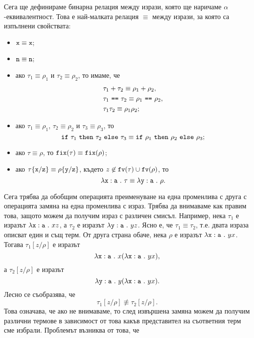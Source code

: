 Сега ще дефинираме бинарна релация между изрази, която ще наричаме $\alpha$-еквивалентност.
Това е най-малката релация $\equiv$ между изрази, за която са изпълнени свойствата:
\begin{itemize}
\item
  $\texttt{x} \equiv \texttt{x}$;
\item
  $\texttt{n} \equiv \texttt{n}$;
\item
  ако $\tau_1 \equiv \rho_1$ и $\tau_2 \equiv \rho_2$, то имаме, че
  \begin{align*}
    & \tau_1 + \tau_2 \equiv \rho_1 + \rho_2,\\
    & \tau_1\ \texttt{==}\ \tau_2 \equiv \rho_1\ \texttt{==}\ \rho_2,\\
    & \tau_1 \tau_2 \equiv \rho_1 \rho_2;
  \end{align*}
\item
  ако $\tau_1 \equiv \rho_1$, $\tau_2 \equiv \rho_2$ и $\tau_3 \equiv \rho_3$, то
  \[\texttt{if}\ \tau_1\ \texttt{then}\ \tau_2\ \texttt{else}\ \tau_3 \equiv \texttt{if}\ \rho_1\ \texttt{then}\ \rho_2\ \texttt{else}\ \rho_3;\]
\item
  ако $\tau \equiv \rho$, то $\texttt{fix}(\tau) \equiv \texttt{fix}(\rho)$;
\item
  ако $\tau\{\texttt{x}/\texttt{z}\} \equiv \rho\{\texttt{y}/\texttt{z}\}$, където $z \not\in \texttt{fv}(\tau) \cup \texttt{fv}(\rho)$, то
  \[\lambda\texttt{x}:\texttt{a}\ .\ {\tau} \equiv \lambda\texttt{y}:\texttt{a}\ .\ {\rho}.\]
\end{itemize}

Сега трябва да обобщим операцията преименуване на една променлива с друга с
операцията замяна на една променлива с израз.
Трябва да внимаваме как правим това, защото можем да получим
израз с различен смисъл. Например, нека $\tau_1$ е изразът $\lamb{x}{a}{xz}$,
а $\tau_2$ е изразът $\lamb{y}{a}{yz}$. Ясно е, че $\tau_1 \equiv \tau_2$, т.е. двата израза описват един и същ терм.
От друга страна обаче, нека $\rho$ е изразът $\lamb{x}{a}{yx}$. Тогава
$\tau_1[z/\rho]$ е изразът
\[\lambda\texttt{x}:\texttt{a}\ .\ {x(\lambda\texttt{x}:\texttt{a}\ .\ {yx})},\]
а $\tau_2[z/\rho]$ е изразът
\[\lambda\texttt{y}:\texttt{a}\ .\ {y(\lambda\texttt{x}:\texttt{a}\ .\ {yx})}.\]
Лесно се съобразява, че
\[\tau_1[z/\rho] \not\equiv \tau_2[z/\rho].\]
Това означава, че ако не внимаваме, то след извършена замяна можем да получим различни термове в
зависимост от това какъв представител на съответния терм сме избрали.
Проблемът възниква от това, че $$


